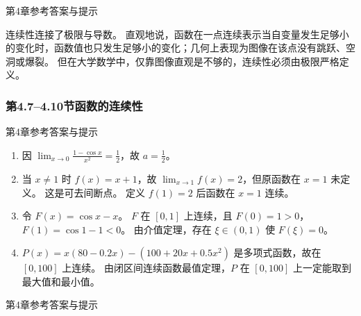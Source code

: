 \documentclass[aspectratio=169,10pt,fontset=fandol]{ctexbeamer}
\begin{document}
\begin{frame}[t,fragile]{第4章参考答案与提示}
\normalsize
{\normalsize




连续性连接了极限与导数。 直观地说，函数在一点连续表示当自变量发生足够小的变化时，函数值也只发生足够小的变化；几何上表现为图像在该点没有跳跃、空洞或爆裂。 但在大学数学中，仅靠图像直观是不够的，连续性必须由极限严格定义。



\subsubsection*{第4.7--4.10节\quad 函数的连续性}




}
\end{frame}
\begin{frame}[t,fragile]{第4章参考答案与提示}
\normalsize
{\normalsize
\begin{enumerate}[label=\textbf{练习\arabic*.},leftmargin=2.2em]

\item 因 $\lim_{x\to0}\frac{1-\cos x}{x^2}=\frac12$，故 $a=\frac12$。

\item 当 $x\neq1$ 时 $f(x)=x+1$，故 $\lim_{x\to1}f(x)=2$，但原函数在 $x=1$ 未定义。 这是可去间断点。 定义 $f(1)=2$ 后函数在 $x=1$ 连续。

\item 令 $F(x)=\cos x-x$。 $F$ 在 $[0,1]$ 上连续，且 $F(0)=1>0$，$F(1)=\cos1-1<0$。 由介值定理，存在 $\xi\in(0,1)$ 使 $F(\xi)=0$。

\item $P(x)=x(80-0.2x)-(100+20x+0.5x^2)$ 是多项式函数，故在 $[0,100]$ 上连续。 由闭区间连续函数最值定理，$P$ 在 $[0,100]$ 上一定能取到最大值和最小值。

\end{enumerate}
}
\end{frame}
\begin{frame}[t,fragile]{第4章参考答案与提示}
\normalsize
{\normalsize




\fi




}
\end{frame}
\end{document}
